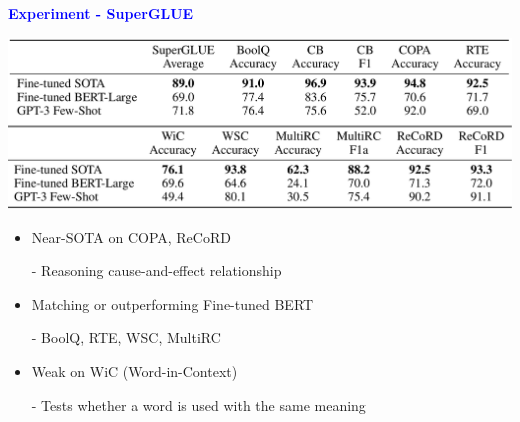 \documentclass[professionalfont]{beamer}
\begin{document}
\begin{frame}

\begin{center}
    { \textbf{\textcolor{blue}{ {\fontsize{12}{14}\selectfont Experiment - SuperGLUE} }} }
\end{center}

\begin{center}
    \includegraphics[width=1.0\textwidth]{table/3-8.jpeg}
\end{center}

{\fontsize{10}{14}\selectfont 
\begin{itemize}
    \item Near-SOTA on COPA, ReCoRD

    - Reasoning cause-and-effect relationship

    \item Matching or outperforming Fine-tuned BERT

    - BoolQ, RTE, WSC, MultiRC

    \item Weak on WiC (Word-in-Context)

    - Tests whether a word is used with the same meaning

\end{itemize}
}

\end{frame}
\end{document}
